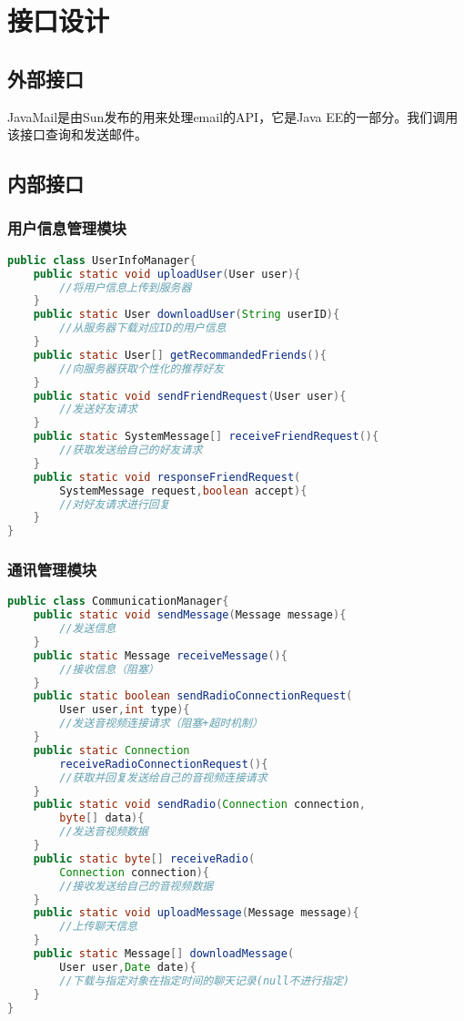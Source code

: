 \chapter{接口设计}
\section{外部接口}
JavaMail是由Sun发布的用来处理email的API，它是Java EE的一部分。我们调用该接口查询和发送邮件。

\section{内部接口}
\subsection{用户信息管理模块}
\begin{lstlisting}[language=Java, caption=用户信息管理模块接口]
public class UserInfoManager{
    public static void uploadUser(User user){
        //将用户信息上传到服务器
    }
    public static User downloadUser(String userID){
        //从服务器下载对应ID的用户信息
    }
    public static User[] getRecommandedFriends(){
        //向服务器获取个性化的推荐好友
    }
    public static void sendFriendRequest(User user){
        //发送好友请求
    }
    public static SystemMessage[] receiveFriendRequest(){
        //获取发送给自己的好友请求
    }
    public static void responseFriendRequest(
        SystemMessage request,boolean accept){
        //对好友请求进行回复
    }
}

\end{lstlisting}




\subsection{通讯管理模块}
\begin{lstlisting}[language=Java, caption=通讯管理模块接口]
public class CommunicationManager{
    public static void sendMessage(Message message){
        //发送信息
    }
    public static Message receiveMessage(){
        //接收信息（阻塞）
    }
    public static boolean sendRadioConnectionRequest(
        User user,int type){
        //发送音视频连接请求（阻塞+超时机制）
    }
    public static Connection 
        receiveRadioConnectionRequest(){
        //获取并回复发送给自己的音视频连接请求
    }
    public static void sendRadio(Connection connection,
        byte[] data){
        //发送音视频数据
    }
    public static byte[] receiveRadio(
        Connection connection){
        //接收发送给自己的音视频数据
    }
    public static void uploadMessage(Message message){
        //上传聊天信息
    }
    public static Message[] downloadMessage(
        User user,Date date){
        //下载与指定对象在指定时间的聊天记录(null不进行指定)
    }
}
\end{lstlisting}


